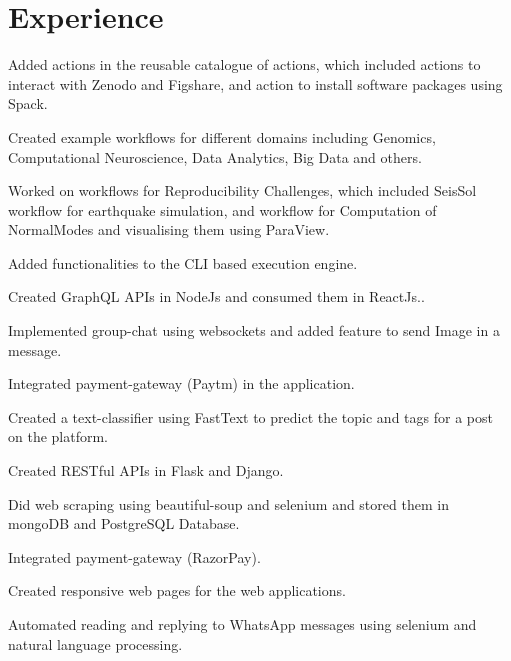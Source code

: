 \documentclass[]{deedy-resume-openfont}
\begin{document}
\begin{minipage}[t]{0.66\textwidth} 


\section{Experience}

\vspace{\topsep} %
\begin{tightemize}\item Added actions in the reusable catalogue of actions, which included actions to interact with Zenodo and Figshare, and action to install software packages using Spack.\item Created example workflows for different domains including Genomics, Computational Neuroscience, Data Analytics, Big Data and others.\item Worked on workflows for Reproducibility Challenges, which included SeisSol workflow for earthquake simulation, and workflow for Computation of NormalModes and visualising them using ParaView.\item Added functionalities to the CLI based execution engine.
\end{tightemize}
\sectionsep

\begin{tightemize}
\item Created GraphQL APIs in NodeJs and consumed them in ReactJs..\item Implemented group-chat using websockets and added feature to send Image in a message.\item Integrated payment-gateway (Paytm) in the application.\item Created a text-classifier using FastText to predict the topic and tags for a post on the platform.\end{tightemize}
\sectionsep

\begin{tightemize}
\item Created RESTful APIs in Flask and Django.\item Did web scraping using beautiful-soup and selenium and stored them in mongoDB and PostgreSQL Database.\item Integrated payment-gateway (RazorPay).\item Created responsive web pages for the web applications. \item Automated reading and replying to WhatsApp messages using selenium and natural language processing. \end{tightemize}
\sectionsep


\end{minipage}
\end{document}
